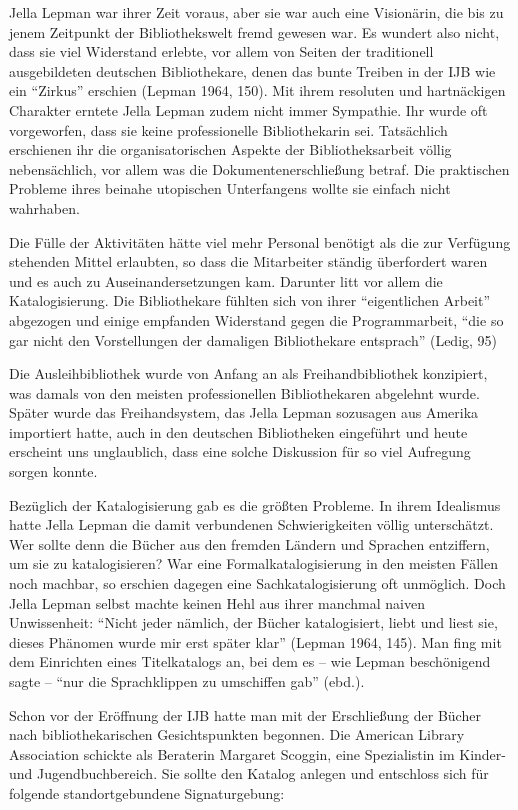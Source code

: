 \documentclass[a4paper,
fontsize=11pt,
oneside,
numbers=noperiodatend,
parskip=half-,
bibliography=totoc,
final
]{scrartcl}
\begin{document}
Jella Lepman war ihrer Zeit voraus, aber sie war auch eine Visionärin,
die bis zu jenem Zeitpunkt der Bibliothekswelt fremd gewesen war. Es
wundert also nicht, dass sie viel Widerstand erlebte, vor allem von
Seiten der traditionell ausgebildeten deutschen Bibliothekare, denen das
bunte Treiben in der IJB wie ein \enquote{Zirkus} erschien (Lepman 1964,
150). Mit ihrem resoluten und hartnäckigen Charakter erntete Jella
Lepman zudem nicht immer Sympathie. Ihr wurde oft vorgeworfen, dass sie
keine professionelle Bibliothekarin sei. Tatsächlich erschienen ihr die
organisatorischen Aspekte der Bibliotheksarbeit völlig nebensächlich,
vor allem was die Dokumentenerschließung betraf. Die praktischen
Probleme ihres beinahe utopischen Unterfangens wollte sie einfach nicht
wahrhaben.~

Die Fülle der Aktivitäten hätte viel mehr Personal benötigt als die zur
Verfügung stehenden Mittel erlaubten, so dass die Mitarbeiter ständig
überfordert waren und es auch zu Auseinandersetzungen kam. Darunter litt
vor allem die Katalogisierung. Die Bibliothekare fühlten sich von ihrer
\enquote{eigentlichen Arbeit} abgezogen und einige empfanden Widerstand
gegen die Programmarbeit, \enquote{die so gar nicht den Vorstellungen
der damaligen Bibliothekare entsprach} (Ledig, 95)~

Die Ausleihbibliothek wurde von Anfang an als Freihandbibliothek
konzipiert, was damals von den meisten professionellen Bibliothekaren
abgelehnt wurde. Später wurde das Freihandsystem, das Jella Lepman
sozusagen aus Amerika importiert hatte, auch in den deutschen
Bibliotheken eingeführt und heute erscheint uns unglaublich, dass eine
solche Diskussion für so viel Aufregung sorgen konnte.

Bezüglich der Katalogisierung gab es die größten Probleme. In ihrem
Idealismus hatte Jella Lepman die damit verbundenen Schwierigkeiten
völlig unterschätzt. Wer sollte denn die Bücher aus den fremden Ländern
und Sprachen entziffern, um sie zu katalogisieren? War eine
Formalkatalogisierung in den meisten Fällen noch machbar, so erschien
dagegen eine Sachkatalogisierung oft unmöglich. Doch Jella Lepman selbst
machte keinen Hehl aus ihrer manchmal naiven Unwissenheit:
\enquote{Nicht jeder nämlich, der Bücher katalogisiert, liebt und liest
sie, dieses Phänomen wurde mir erst später klar} (Lepman 1964, 145). Man
fing mit dem Einrichten eines Titelkatalogs an, bei dem es -- wie Lepman
beschönigend sagte -- \enquote{nur die Sprachklippen zu umschiffen gab}
(ebd.).

Schon vor der Eröffnung der IJB hatte man mit der Erschließung der
Bücher nach bibliothekarischen Gesichtspunkten begonnen. Die American
Library Association schickte als Beraterin Margaret Scoggin, eine
Spezialistin im Kinder- und Jugendbuchbereich. Sie sollte den Katalog
anlegen und entschloss sich für folgende standortgebundene
Signaturgebung:
\end{document}
